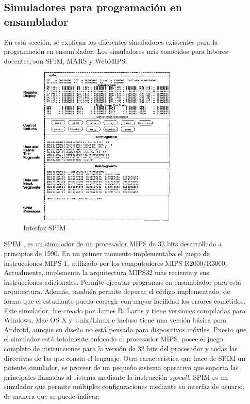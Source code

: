 \subsection{Simuladores para programación en ensamblador}
\label{sec:simuladores_ensamblador}
En esta sección, se explican los diferentes simuladores existentes para la programación en ensamblador. Los simuladores más conocidos para labores docentes, son SPIM, MARS y WebMIPS.

\begin{figure}[htbp]
 	\centering
 	\includegraphics[width=8cm]{figures/spim_figure}
 	\caption{Interfaz SPIM.}
	\label{fig:spim_figure}
\end{figure}

SPIM \cite{larus1990spim}, es un simulador de un procesador MIPS de 32 bits desarrollado a principios de 1990. En un primer momento implementaba el juego de instrucciones MIPS-1, utilizado por los computadores MIPS R2000/R3000. Actualmente, implementa la arquitectura MIPS32 más reciente y sus instrucciones adicionales. Permite ejecutar programas en ensamblador para esta arquitectura. Además, también permite depurar el código implementado, de forma que el estudiante pueda corregir con mayor facilidad los errores cometidos. Este simulador, fue creado por James R. Larus y tiene versiones compiladas para Windows, Mac OS X y Unix/Linux e incluso tiene una versión básica para Android, aunque su diseño no está pensado para dispositivos móviles. Puesto que el simulador está totalmente enfocado al procesador MIPS, posee el juego completo de instrucciones para la versión de 32 bits del procesador y todas las directivas de las que consta el lenguaje. Otra característica que hace de SPIM un potente simulador, es proveer de un pequeño sistema operativo que soporta las principales llamadas al sistema mediante la instrucción \emph{syscall}. SPIM es un simulador que permite múltiples configuraciones mediante su interfaz de usuario, de manera que se puede indicar:

